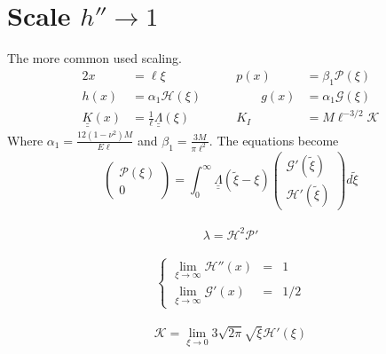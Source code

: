\documentclass{article}
\newcommand{\sP}{\mathscr{P}}                               %
\newcommand{\sH}{\mathscr{H}}                               %
\newcommand{\sG}{\mathscr{G}}                               %
\newcommand{\sK}{\mathscr{K}}                               %
\begin{document}
\section{Scale $h''\to1$}
The more common used scaling.
\begin{alignat*}{2}
x &= \ell \xi  & p(x) &= \beta_1 \sP (\xi) \\
h(x) &= \alpha_1 \sH(\xi) \qquad & \qquad g(x) &= \alpha_1 \sG(\xi) \\
\underline{\underline{K}}(x) &= \frac{1}{\ell} 
\underline{\underline{\Lambda}}(\xi) & 
K_I &= M \ell^{-3/2} \sK 
\end{alignat*}
Where  $\displaystyle \alpha_1 = \frac{12(1-\nu^2)M}{E\ell}$ and  
$\displaystyle \beta_1 = \frac{3M}{\pi \ell^2}$.
The equations become
\\
\begin{equation}
 \left( \begin{array}{c} \sP(\xi) \\ 0 \end{array} \right) =
\int_0^{\infty} 
\underline{\underline{\Lambda}}(\tilde{\xi}- \xi) 
\left( \begin{array}{c} \sG'(\tilde{\xi}) \\[4pt] \sH'(\tilde{\xi}) \end{array} 
\right) d\tilde{\xi}
\end{equation}
\\
\begin{equation}
\lambda  = \sH^2 \sP'
\end{equation}
\\
\begin{equation}
\left\{ \begin{array}{ccc}
\lim_{\xi\to\infty} \sH''(x) & = & 1 \\[4pt]
\lim_{\xi\to\infty} \sG'(x) & = & 1/2  
\end{array} \right.
\end{equation}
\\
\begin{equation}
\sK = \lim_{\xi\to 0} 3 \sqrt{2\pi} \sqrt{\xi} \sH'(\xi)
\end{equation}
\end{document}

